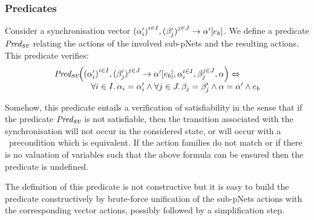 \documentclass{lmcs}
\newtheorem{example}{Example}
\begin{document}

\subsubsection*{Predicates} 
Consider a synchronisation vector ${(\alpha'_i)}^{i\in I}, {(\beta'_j)}^{j\in J}\to \alpha' [e_b]$. We 
define a
predicate $\Predsv$ relating
the actions of the involved sub-pNets and the resulting actions. This predicate verifies:
\[\begin{array}{l}\Predsv \Big(\SV{{(\alpha'_i)}^{i\in I}, {(\beta'_j)}^{j\in J}} 
{\alpha'} 
{e_b}, \alpha_i^{i\in I}, \beta_j^{j\in J}, \alpha\Big)\Leftrightarrow \\~\qquad\qquad%
%
\forall i\in I.\, \alpha_i=\alpha'_i\land \forall j \in J.\, \beta_j=\beta'_j \land 
\alpha=\alpha' 
\land e_b
\end{array} 
\]

Somehow, this predicate entails a verification of satisfiability in the sense that if the 
predicate $\Predsv$ is not satisfiable, then the transition associated with the 
synchronisation will not occur in the considered state, or will occur with a \False\ precondition which is equivalent.
If the action families do not match or if there is no valuation of
variables such that the above formula can be ensured then the predicate is undefined.

The definition of this predicate is not constructive but it is easy to build the predicate constructively by brute-force unification of the sub-pNets actions with the corresponding vector actions, possibly followed by a simplification step.
\end{document}

